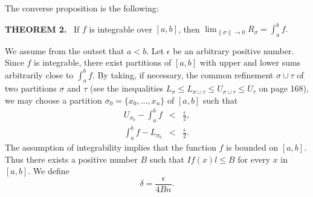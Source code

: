 The converse proposition is the following:
\medskip

\noindent \textbf{THEOREM 2.}~
If $f$ is integrable over $[a, b]$, then $\lim_{\|\sigma \| \rightarrow 0} R_\sigma = \int_a^b f.$


\proof  We assume from the outset that $a < b$. Let $\epsilon$ be an arbitrary positive number. Since $f$ is integrable, there exist partitions of $[a, b]$ with upper and lower sums arbitrarily close to $\int_a^b f$. By taking, if necessary, the common refinement $\sigma \cup \tau$ of two partitions $\sigma$ and $\tau$ (see the inequalities $L_\sigma \leq L_{\sigma \cup \tau} \leq U_{\sigma \cup \tau} \leq U_\tau$ on page 168), we may choose a partition $\sigma_0 = \{ x_0, . . ., x_n \}$ of $[a, b]$ such that
\begin{eqnarray*}
U_{\sigma_0} - \int_a^b f &<& \frac{\epsilon}{2} ,  \\
\int_a^b f - L_{\sigma_0} &<& \frac{\epsilon}{2} .
\end{eqnarray*}
The assumption of integrability implies that the function $f$ is bounded on $[a, b]$. Thus there exists a positive number $B$ such that $If(x)l \leq B$ for every $x$ in $[a, b]$. We define   
$$
\delta = \frac{\epsilon}{4Bn} .
$$

